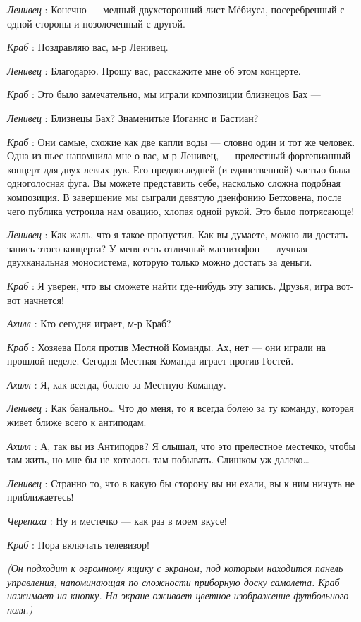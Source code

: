 \emph{Ленивец} : Конечно --- медный двухсторонний лист Мёбиуса, посеребренный с одной стороны и позолоченный с другой.

\emph{Краб} : Поздравляю вас, м-р Ленивец.

\emph{Ленивец} : Благодарю. Прошу вас, расскажите мне об этом концерте.

\emph{Краб} : Это было замечательно, мы играли композиции близнецов Бах ---

\emph{Ленивец} : Близнецы Бах? Знаменитые Иоганнс и Бастиан?

\emph{Краб} : Они самые, схожие как две капли воды --- словно один и тот же человек. Одна из пьес напомнила мне о вас, м-р Ленивец, --- прелестный фортепианный концерт для двух левых рук. Его предпоследней (и единственной) частью была одноголосная фуга. Вы можете представить себе, насколько сложна подобная композиция. В завершение мы сыграли девятую дзенфонию Бетховена, после чего публика устроила нам овацию, хлопая одной рукой. Это было потрясающе!

\emph{Ленивец} : Как жаль, что я такое пропустил. Как вы думаете, можно ли достать запись этого концерта? У меня есть отличный магнитофон --- лучшая двухканальная моносистема, которую только можно достать за деньги.

\emph{Краб} : Я уверен, что вы сможете найти где-нибудь эту запись. Друзья, игра вот-вот начнется!

\emph{Ахилл} : Кто сегодня играет, м-р Краб?

\emph{Краб} : Хозяева Поля против Местной Команды. Ах, нет --- они играли на прошлой неделе. Сегодня Местная Команда играет против Гостей.

\emph{Ахилл} : Я, как всегда, болею за Местную Команду.

\emph{Ленивец} : Как банально\ldots{} Что до меня, то я всегда болею за ту команду, которая живет ближе всего к антиподам.

\emph{Ахилл} : А, так вы из Антиподов? Я слышал, что это прелестное местечко, чтобы там жить, но мне бы не хотелось там побывать. Слишком уж далеко\ldots{}

\emph{Ленивец} : Странно то, что в какую бы сторону вы ни ехали, вы к ним ничуть не приближаетесь!

\emph{Черепаха} : Ну и местечко --- как раз в моем вкусе!

\emph{Краб} : Пора включать телевизор!

\emph{(Он подходит к огромному ящику с экраном, под которым находится панель управления, напоминающая по сложности приборную доску самолета. Краб нажимает на кнопку. На экране оживает цветное изображение футбольного поля.)}

